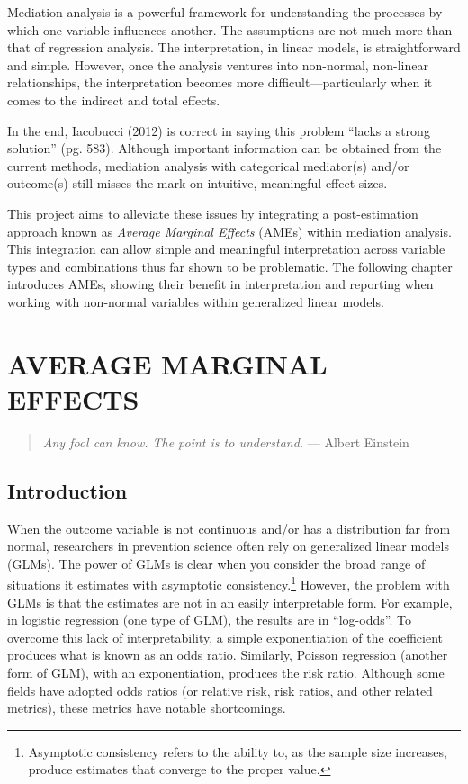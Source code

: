 \documentclass[]{DissertateUSU}
\let\rmarkdownfootnote\footnote%
\def\footnote{\protect\rmarkdownfootnote}
\begin{document}
Mediation analysis is a powerful framework for understanding the
processes by which one variable influences another. The assumptions are
not much more than that of regression analysis. The interpretation, in
linear models, is straightforward and simple. However, once the analysis
ventures into non-normal, non-linear relationships, the interpretation
becomes more difficult---particularly when it comes to the indirect and
total effects.\medskip

In the end, Iacobucci (2012) is correct in saying this problem ``lacks a
strong solution'' (pg. 583). Although important information can be
obtained from the current methods, mediation analysis with categorical
mediator(s) and/or outcome(s) still misses the mark on intuitive,
meaningful effect sizes.\medskip

This project aims to alleviate these issues by integrating a
post-estimation approach known as \emph{Average Marginal Effects} (AMEs)
within mediation analysis. This integration can allow simple and
meaningful interpretation across variable types and combinations thus
far shown to be problematic. The following chapter introduces AMEs,
showing their benefit in interpretation and reporting when working with
non-normal variables within generalized linear models.

\FloatBarrier

\newpage

 \fancyhead[R]{\thepage}
\fancyfoot[C]{}

\chapter{AVERAGE MARGINAL EFFECTS}

\begin{quote}
\emph{Any fool can know. The point is to understand.}
--- Albert Einstein
\end{quote}

\doublespacing

\section{Introduction}\label{introduction-1}

When the outcome variable is not continuous and/or has a distribution
far from normal, researchers in prevention science often rely on
generalized linear models (GLMs). The power of GLMs is clear when you
consider the broad range of situations it estimates with asymptotic
consistency.\footnote{Asymptotic consistency refers to the ability to, as the sample size increases, produce estimates that converge to the proper value.}
However, the problem with GLMs is that the estimates are not in an
easily interpretable form. For example, in logistic regression (one type
of GLM), the results are in ``log-odds''. To overcome this lack of
interpretability, a simple exponentiation of the coefficient produces
what is known as an odds ratio. Similarly, Poisson regression (another
form of GLM), with an exponentiation, produces the risk ratio. Although
some fields have adopted odds ratios (or relative risk, risk ratios, and
other related metrics), these metrics have notable shortcomings.
\end{document}
